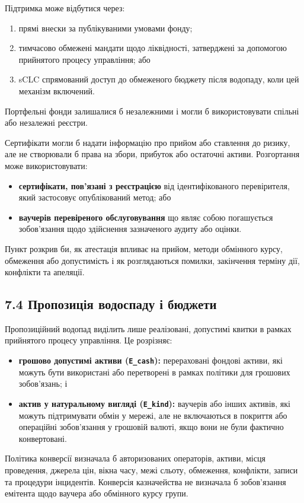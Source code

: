 \documentclass[11pt]{article}
\begin{document}
Підтримка може відбутися через:

\begin{enumerate}[leftmargin=*]
\item прямі внески за публікуваними умовами фонду;
\item тимчасово обмежені мандати щодо ліквідності, затверджені за допомогою прийнятого процесу управління; або
\item sCLC спрямований доступ до обмеженого бюджету після водопаду, коли цей механізм включений.
\end{enumerate}
Портфельні фонди залишалися б незалежними і могли б використовувати спільні або незалежні реєстри.

Сертифікати могли б надати інформацію про прийом або ставлення до ризику, але не створювали б права на збори, прибуток або остаточні активи. Розгортання може використовувати:

\begin{itemize}[leftmargin=*]
\item \textbf{сертифікати, пов'язані з реєстрацією} від ідентифікованого перевірителя, який застосовує опублікований метод; або
\item \textbf{ваучерів перевіреного обслуговування} що являє собою погашується зобов'язання щодо здійснення зазначеного аудиту або оцінки.
\end{itemize}
Пункт розкрив би, як атестація впливає на прийом, методи обмінного курсу, обмеження або допустимість і як розглядаються помилки, закінчення терміну дії, конфлікти та апеляції.

\subsection*{7.4 Пропозиція водоспаду і бюджети}

Пропозиційний водопад виділить лише реалізовані, допустимі квитки в рамках прийнятого процесу управління. Це розрізняє:

\begin{itemize}[leftmargin=*]
\item \textbf{грошово допустимі активи (\texttt{E\_cash}):} перераховані фондові активи, які можуть бути використані або перетворені в рамках політики для грошових зобов'язань; і
\item \textbf{актив у натуральному вигляді (\texttt{E\_kind}):} ваучерів або інших активів, які можуть підтримувати обмін у мережі, але не включаються в покриття або операційні зобов'язання у грошовій валюті, якщо вони не були фактично конвертовані.
\end{itemize}
Політика конверсії визначала б авторизованих операторів, активи, місця проведення, джерела цін, вікна часу, межі сльоту, обмеження, конфлікти, записи та процедури інцидентів. Конверсія казначейства не визначала б зобов'язання емітента щодо ваучера або обмінного курсу групи.
\end{document}
